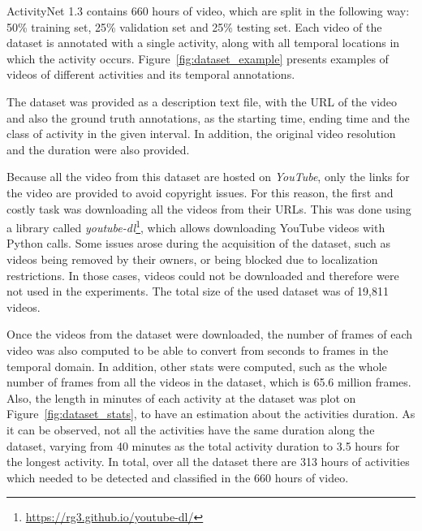 ActivityNet 1.3 contains 660 hours of video, which are split in the following way: 50\% training set, 25\% validation set and 25\% testing set. Each video of the dataset is annotated with a single activity, along with all temporal locations in which the activity occurs. Figure~\ref{fig:dataset_example} presents examples of videos of different activities and its temporal annotations.

The dataset was provided as a description text file, with the URL of the video and also the ground truth annotations, as the starting time, ending time and the class of activity in the  given interval. In addition, the original video resolution and the duration were also provided.

Because all the video from this dataset are hosted on \textit{YouTube}, only the links for the video are provided to avoid copyright issues. For this reason, the first and costly task was downloading all the videos from their URLs. This was done using a library called \textit{youtube-dl}\footnote{\url{https://rg3.github.io/youtube-dl/}}, which allows downloading YouTube videos with Python calls. Some issues arose during the acquisition of the dataset, such as videos being removed by their owners, or being blocked due to localization restrictions. In those cases, videos could not be downloaded and therefore were not used in the experiments. The total size of the used dataset was of 19,811 videos.


Once the videos from the dataset were downloaded, the number of frames of each video was also computed to be able to convert from seconds to frames in the temporal domain. 
In addition, other stats were computed, such as the whole number of frames from all the videos in the dataset, which is 65.6 million frames. Also, the length in minutes of each activity at the dataset was plot on Figure~\ref{fig:dataset_stats}, to have an estimation about the activities duration. As it can be observed, not all the activities have the same duration along the dataset, varying from 40 minutes as the total activity duration 
to 3.5 hours for the longest activity. In total, over all the dataset there are 313 hours of activities which needed to be detected and classified in the 660 hours of video.

